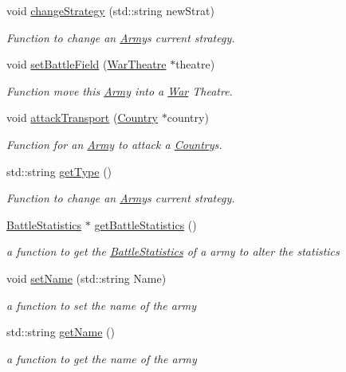 \begin{DoxyCompactItemize}
void \mbox{\hyperlink{class_army_a81abf74b10e24a8f2fd2666d1ce54239}{change\+Strategy}} (std\+::string new\+Strat)
\begin{DoxyCompactList}\small\item\em Function to change an \mbox{\hyperlink{class_army}{Army}}\textquotesingle{}s current strategy. \end{DoxyCompactList}\item 
void \mbox{\hyperlink{class_army_a2150e3e29e2fac86401b0263ec0e18d9}{set\+Battle\+Field}} (\mbox{\hyperlink{class_war_theatre}{War\+Theatre}} $\ast$theatre)
\begin{DoxyCompactList}\small\item\em Function move this \mbox{\hyperlink{class_army}{Army}} into a \mbox{\hyperlink{class_war}{War}} Theatre. \end{DoxyCompactList}\item 
void \mbox{\hyperlink{class_army_a6038ff12345f993b2aab1740a9f0a6a6}{attack\+Transport}} (\mbox{\hyperlink{class_country}{Country}} $\ast$country)
\begin{DoxyCompactList}\small\item\em Function for an \mbox{\hyperlink{class_army}{Army}} to attack a \mbox{\hyperlink{class_country}{Country}}\textquotesingle{}s. \end{DoxyCompactList}\item 
std\+::string \mbox{\hyperlink{class_army_a970b4df6878127a902c04df760c8ea5d}{get\+Type}} ()
\begin{DoxyCompactList}\small\item\em Function to change an \mbox{\hyperlink{class_army}{Army}}\textquotesingle{}s current strategy. \end{DoxyCompactList}\item 
\mbox{\hyperlink{class_battle_statistics}{Battle\+Statistics}} $\ast$ \mbox{\hyperlink{class_army_afc9db890d8daf5eedd176a532b4a801e}{get\+Battle\+Statistics}} ()
\begin{DoxyCompactList}\small\item\em a function to get the \mbox{\hyperlink{class_battle_statistics}{Battle\+Statistics}} of a army to alter the statistics \end{DoxyCompactList}\item 
void \mbox{\hyperlink{class_army_a54af3a0b0beab32446d47bb409a39685}{set\+Name}} (std\+::string Name)
\begin{DoxyCompactList}\small\item\em a function to set the name of the army \end{DoxyCompactList}\item 
std\+::string \mbox{\hyperlink{class_army_a23b0ec0aa78d6b30a9d18b73ebd38d28}{get\+Name}} ()
\begin{DoxyCompactList}\small\item\em a function to get the name of the army \end{DoxyCompactList}\end{DoxyCompactItemize}
